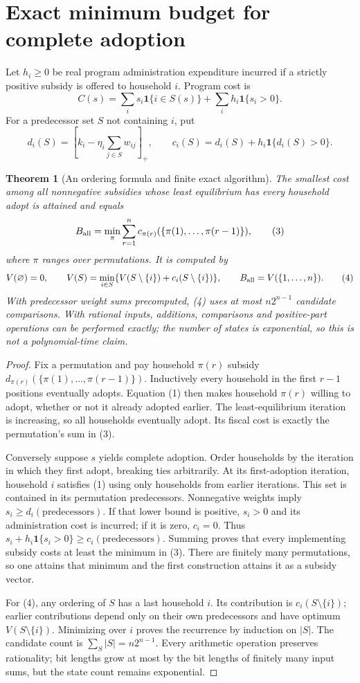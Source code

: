 \documentclass[11pt]{article}
\newtheorem{theorem}{Theorem}
\newcommand{\Ind}{\mathbf 1}
\begin{document}
\section{Exact minimum budget for complete adoption}
Let $h_i\geq0$ be real program administration expenditure incurred if a
strictly positive subsidy is offered to household $i$. Program cost is
\[
 C(s)=\sum_i s_i\Ind\{i\in S(s)\}
                       +\sum_i h_i\Ind\{s_i>0\}.
\]
For a predecessor set $S$ not containing $i$, put
\[
 d_i(S)=\left[k_i-\eta_i\sum_{j\in S}w_{ij}\right]_+,
 \qquad c_i(S)=d_i(S)+h_i\Ind\{d_i(S)>0\}.            \tag{2}
\]

\begin{theorem}[An ordering formula and finite exact algorithm]\label{order}
The smallest cost among all nonnegative subsidies whose least equilibrium
has every household adopt is attained and equals
\[
 B_{\rm all}=\min_{\pi}\sum_{r=1}^n
        c_{\pi(r)}(\{\pi(1),\ldots,\pi(r-1)\}),             \tag{3}
\]
where $\pi$ ranges over permutations. It is computed by
\[
 V(\varnothing)=0,\qquad
 V(S)=\min_{i\in S}\{V(S\setminus\{i\})+c_i(S\setminus\{i\})\},
 \qquad B_{\rm all}=V(\{1,\ldots,n\}).                     \tag{4}
\]
With predecessor weight sums precomputed, (4) uses at most $n2^{n-1}$
candidate comparisons. With rational inputs, additions, comparisons and
positive-part operations can be performed exactly; the number of states
is exponential, so this is not a polynomial-time claim.
\end{theorem}
\begin{proof}
Fix a permutation and pay household $\pi(r)$ subsidy
$d_{\pi(r)}(\{\pi(1),\ldots,\pi(r-1)\})$. Inductively every household
in the first $r-1$ positions eventually adopts. Equation (1) then makes
household $\pi(r)$ willing to adopt, whether or not it already adopted
earlier. The least-equilibrium iteration is increasing, so all households
eventually adopt. Its fiscal cost is exactly the permutation's sum in (3).

Conversely suppose $s$ yields complete adoption. Order households by the
iteration in which they first adopt, breaking ties arbitrarily. At its
first-adoption iteration, household $i$ satisfies (1) using only households
from earlier iterations. This set is contained in its permutation
predecessors. Nonnegative weights imply
$s_i\geq d_i(\text{predecessors})$. If that lower bound is positive,
$s_i>0$ and its administration cost is incurred; if it is zero, $c_i=0$.
Thus $s_i+h_i\Ind\{s_i>0\}\geq c_i(\text{predecessors})$.
Summing proves that every implementing subsidy costs at least the minimum
in (3). There are finitely many permutations, so one attains that minimum
and the first construction attains it as a subsidy vector.

For (4), any ordering of $S$ has a last household $i$. Its contribution is
$c_i(S\setminus\{i\})$; earlier contributions depend only on their own
predecessors and have optimum $V(S\setminus\{i\})$. Minimizing over
$i$ proves the recurrence by induction on $|S|$. The candidate count is
$\sum_S|S|=n2^{n-1}$. Every arithmetic operation preserves rationality;
bit lengths grow at most by the bit lengths of finitely many input sums,
but the state count remains exponential.
\end{proof}
\end{document}
